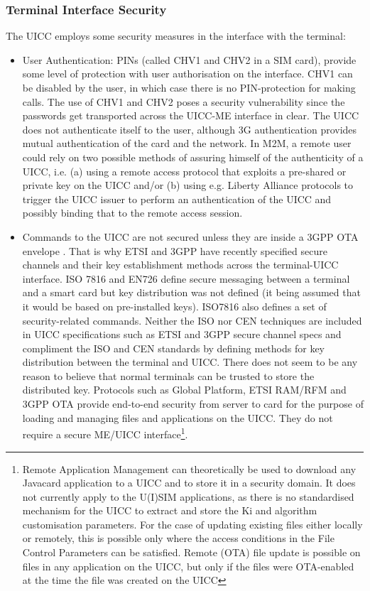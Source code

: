\documentclass[12pt]{article}
\begin{document}
\subsubsection{Terminal Interface Security}
The UICC employs some security measures in the interface with the terminal:
\begin{itemize}
\item User Authentication: PINs (called CHV1 and CHV2 in a SIM card), provide some level of protection with user authorisation on the interface. CHV1 can be disabled by the user, in which case there is no PIN-protection for making calls. The use of CHV1 and CHV2 poses a security vulnerability since the passwords get transported across the UICC-ME interface in clear. The UICC does not authenticate itself to the user, although 3G authentication  provides mutual authentication of the card and the network. In M2M, a remote user could rely on two possible methods of assuring himself of the authenticity of a UICC, i.e. (a) using a remote access protocol that exploits a pre-shared or private key on the UICC and/or (b) using e.g. Liberty Alliance  protocols to trigger the UICC issuer to perform an authentication of the UICC and possibly binding that to the remote access session.

\item  Commands to the UICC are not secured unless they are inside a 3GPP OTA envelope . That is why ETSI and 3GPP have recently specified secure channels and their key establishment methods across the terminal-UICC interface. ISO 7816 and EN726  define secure messaging between a terminal and a smart card but key distribution was not defined (it being assumed that it would be based on pre-installed keys). ISO7816 also defines a set of security-related commands. Neither the ISO nor CEN techniques are included in UICC specifications such as ETSI and 3GPP secure channel specs and compliment the ISO and CEN standards by defining methods for key distribution between the terminal and UICC. There does not seem to be any reason to believe that normal terminals can be trusted to store the distributed key. Protocols such as Global Platform, ETSI RAM/RFM and 3GPP OTA provide end-to-end security from server to card for the purpose of loading and managing files and applications on the UICC. They do not require a secure ME/UICC interface\footnote{Remote Application Management can theoretically be used to download any Javacard application to a UICC and to store it in a security domain. It does not currently apply to the U(I)SIM applications, as there is no standardised mechanism for the UICC to extract and store the Ki and algorithm customisation parameters. For the case of updating existing files either locally or remotely, this is possible only where the access conditions in the File Control Parameters can be satisfied. Remote (OTA) file update is possible on files in any application on the UICC, but only if the files were OTA-enabled at the time the file was created on the UICC}.


\end{itemize}
\end{document}
